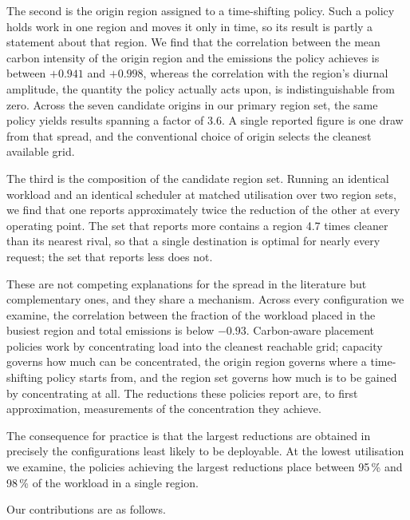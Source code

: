 The second is the origin region assigned to a time-shifting policy. Such a
policy holds work in one region and moves it only in time, so its result is
partly a statement about that region. We find that the correlation between the
mean carbon intensity of the origin region and the emissions the policy achieves
is between $+0.941$ and $+0.998$, whereas the correlation with the region's
diurnal amplitude, the quantity the policy actually acts upon, is
indistinguishable from zero. Across the seven candidate origins in our primary
region set, the same policy yields results spanning a factor of 3.6. A single
reported figure is one draw from that spread, and the conventional choice of
origin selects the cleanest available grid.

The third is the composition of the candidate region set. Running an identical
workload and an identical scheduler at matched utilisation over two region sets,
we find that one reports approximately twice the reduction of the other at every
operating point. The set that reports more contains a region 4.7 times cleaner
than its nearest rival, so that a single destination is optimal for nearly every
request; the set that reports less does not.

These are not competing explanations for the spread in the literature but
complementary ones, and they share a mechanism. Across every configuration we
examine, the correlation between the fraction of the workload placed in the
busiest region and total emissions is below $-0.93$. Carbon-aware placement
policies work by concentrating load into the cleanest reachable grid; capacity
governs how much can be concentrated, the origin region governs where a
time-shifting policy starts from, and the region set governs how much is to be
gained by concentrating at all. The reductions these policies report are, to
first approximation, measurements of the concentration they achieve.

The consequence for practice is that the largest reductions are obtained in
precisely the configurations least likely to be deployable. At the lowest
utilisation we examine, the policies achieving the largest reductions place
between 95\,\% and 98\,\% of the workload in a single region.

Our contributions are as follows.

